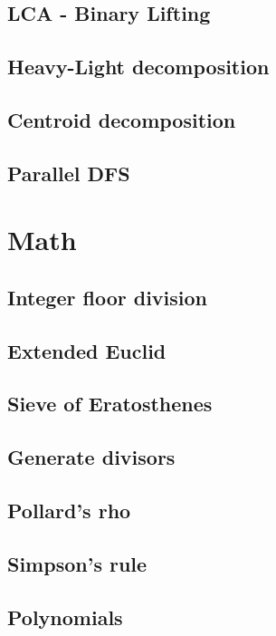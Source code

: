 \subsection{LCA - Binary Lifting}
\subsection{Heavy-Light decomposition}
\subsection{Centroid decomposition}
\subsection{Parallel DFS}

\section{Math}
\subsection{Integer floor division}
\subsection{Extended Euclid}
\subsection{Sieve of Eratosthenes}
\subsection{Generate divisors}
\subsection{Pollard's rho}
\subsection{Simpson's rule}
\subsection{Polynomials}
